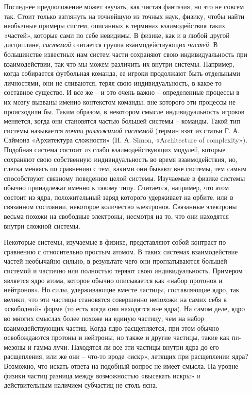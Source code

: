\documentclass[../main.tex]{subfiles}
\begin{document}
Последнее предположение может звучать, как чистая фантазия, но это не совсем так. Стоит только взглянуть на точнейшую из точных наук, физику, чтобы найти необычные примеры систем, описанных в терминах взаимодействия таких «частей», которые сами по себе невидимы. В физике, как и в любой другой дисциплине, \emph{системой} считается группа взаимодействующих \emph{частей}. В большинстве известных нам систем части сохраняют свою индивидуальность при взаимодействии, так что мы можем различить их внутри системы. Например, когда собирается футбольная команда, ее игроки продолжают быть отдельными личностями, они не сливаются, теряя свою индивидуальность, в какое-то составное существо. И все же \--- и это очень важно \--- определенные процессы в их мозгу вызваны именно контекстом команды, вне которого эти процессы не происходили бы. Таким образом, в некотором смысле индивидуальность игроков меняется, когда они становятся частью большей системы \--- команды. Такой тип системы называется \emph{почти разложимой системой} (термин взят из статьи Г. А. Саймона «Архитектура сложности» (H. А. Simon, «Architecture of complexity»). Подобная система состоит из слабо взаимодействующих модулей, которые сохраняют свою собственную индивидуальность во время взаимодействия, но, слегка меняясь по сравнению с тем, какими они бывают вне системы, тем самым способствуют связному поведению целой системы. Изучаемые в физике системы обычно принадлежат именно к такому типу. Считается, например, что атом состоит из ядра, положительный заряд которого удерживает на орбите, или в связанном состоянии, некоторое количество электронов. Связанные электроны весьма похожи на свободные электроны, несмотря на то, что они находятся внутри сложной системы.

Некоторые системы, изучаемые в физике, представляют собой контраст по сравнению с относительно простым атомом. В таких системах взаимодействие частей необычайно сильно, в результате чего они проглатываются большей системой и частично или полностью теряют свою индивидуальность. Примером является ядро атома, которое обычно описывается как «набор протонов и нейтронов». Но силы, удерживающие вместе частицы, составляющие ядро, так велики, что эти частицы становятся совершенно непохожи на самих себя в «свободной» форме (то есть когда они находятся вне ядра). На самом деле, ядро во многих смыслах более похоже на единую частицу, чем на набор взаимодействующих частиц. Когда ядро расщепляется, при этом обычно освобождаются протоны и нейтроны, но также и другие частицы, такие как пи-мезоны и гамма-лучи. Находятся ли все эти частицы внутри ядра до его расщепления, или же они \--- что-то вроде «искр», летящих при расщеплении ядра? Возможно, что искать ответа на подобный вопрос не имеет смысла. На уровне физики частиц разница между возможностью «высекать искры» и действительным наличием субчастиц не столь ясна.
\end{document}

